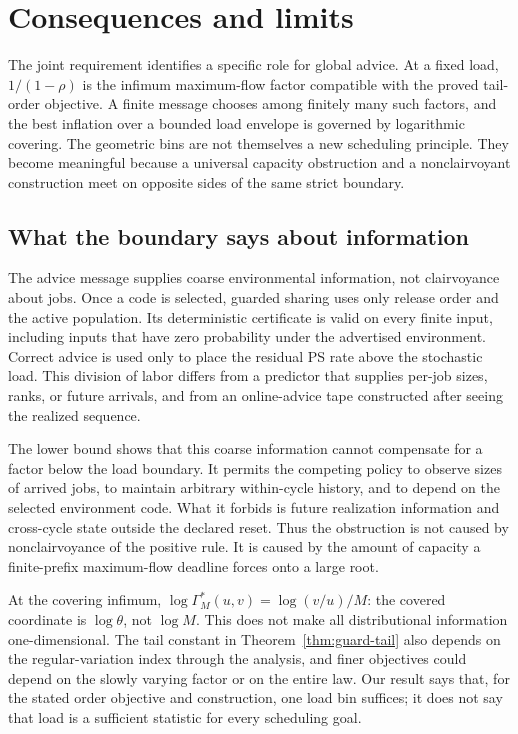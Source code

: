 \section{Consequences and limits}\label{sec:discussion}
The joint requirement identifies a specific role for global advice. At a fixed load, $1/(1-\rho)$ is the infimum maximum-flow factor compatible with the proved tail-order objective. A finite message chooses among finitely many such factors, and the best inflation over a bounded load envelope is governed by logarithmic covering. The geometric bins are not themselves a new scheduling principle. They become meaningful because a universal capacity obstruction and a nonclairvoyant construction meet on opposite sides of the same strict boundary.

\subsection{What the boundary says about information}
The advice message supplies coarse environmental information, not clairvoyance about jobs.  Once a code is selected, guarded sharing uses only release order and the active population.  Its deterministic certificate is valid on every finite input, including inputs that have zero probability under the advertised environment.  Correct advice is used only to place the residual PS rate above the stochastic load.  This division of labor differs from a predictor that supplies per-job sizes, ranks, or future arrivals, and from an online-advice tape constructed after seeing the realized sequence.

The lower bound shows that this coarse information cannot compensate for a factor below the load boundary.  It permits the competing policy to observe sizes of arrived jobs, to maintain arbitrary within-cycle history, and to depend on the selected environment code.  What it forbids is future realization information and cross-cycle state outside the declared reset.  Thus the obstruction is not caused by nonclairvoyance of the positive rule.  It is caused by the amount of capacity a finite-prefix maximum-flow deadline forces onto a large root.

At the covering infimum, $\log\Gamma_M^*(u,v)=\log(v/u)/M$: the covered coordinate is $\log\theta$, not $\log M$.  This does not make all distributional information one-dimensional.  The tail constant in Theorem~\ref{thm:guard-tail} also depends on the regular-variation index through the analysis, and finer objectives could depend on the slowly varying factor or on the entire law.  Our result says that, for the stated order objective and construction, one load bin suffices; it does not say that load is a sufficient statistic for every scheduling goal.

